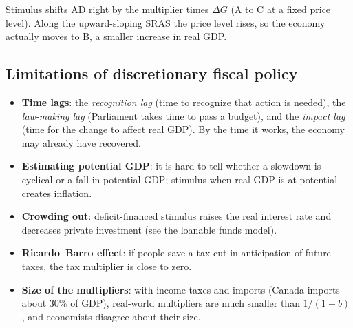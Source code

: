 \begin{center}
\end{center}
Stimulus shifts AD right by the multiplier times $\Delta G$ (A to C at a fixed price level).
Along the upward-sloping SRAS the price level rises, so the economy actually moves to B,
a smaller increase in real GDP.

\subsection{Limitations of discretionary fiscal policy}

\begin{itemize}
  \item \textbf{Time lags}: the \emph{recognition lag} (time to recognize that action is
        needed), the \emph{law-making lag} (Parliament takes time to pass a budget), and
        the \emph{impact lag} (time for the change to affect real GDP). By the time it
        works, the economy may already have recovered.
  \item \textbf{Estimating potential GDP}: it is hard to tell whether a slowdown is
        cyclical or a fall in potential GDP; stimulus when real GDP is at potential creates
        inflation.
  \item \textbf{Crowding out}: deficit-financed stimulus raises the real interest rate and
        decreases private investment (see the loanable funds model).
  \item \textbf{Ricardo--Barro effect}: if people save a tax cut in anticipation of future
        taxes, the tax multiplier is close to zero.
  \item \textbf{Size of the multipliers}: with income taxes and imports (Canada imports
        about 30\% of GDP), real-world multipliers are much smaller than $1/(1 - b)$, and
        economists disagree about their size.
\end{itemize}

